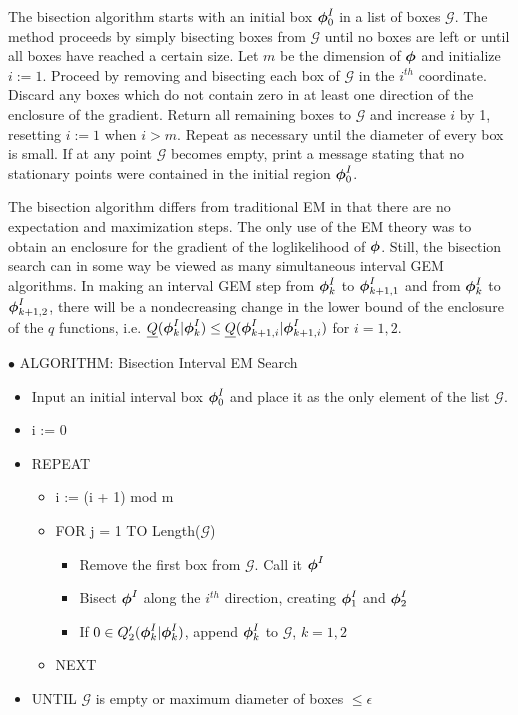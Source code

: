 The bisection algorithm starts with an initial box $\mbox{\boldmath $\phi$}_0^I$ in a
list of boxes $\mathcal{G}$.  The method proceeds by 
simply bisecting boxes from $\mathcal{G}$
until no boxes are left or until all boxes have reached a certain
size.  Let $m$ be the dimension of $\mbox{\boldmath $\phi$}$ and initialize $i := 1$.
Proceed by removing and bisecting each box of $\mathcal{G}$ in the $i^{th}$
coordinate.  Discard any boxes which do not contain zero in at least
one direction of the enclosure of the gradient.  Return all
remaining boxes to $\mathcal{G}$ and increase $i$ by 1, resetting $i := 1$ when
$i > m$.
Repeat as necessary until the diameter of every box is small.  If at
any point $\mathcal{G}$ becomes empty, print a message stating that
no stationary points were contained in the initial region $\mbox{\boldmath $\phi$}^I_0$.

The bisection algorithm differs from traditional EM in that there
are no expectation and maximization steps.  The only use of the EM
theory was to obtain an enclosure for the gradient of the
loglikelihood of $\mbox{\boldmath $\phi$}$.  Still, the bisection search can in some way be
viewed as many simultaneous interval GEM algorithms.  In making an interval GEM
step from
$\mbox{\boldmath $\phi$}_k^I$ to $\mbox{\boldmath $\phi$}_{k+1,1}^I$ and from $\mbox{\boldmath $\phi$}_k^I$ 
to $\mbox{\boldmath $\phi$}_{k+1,2}^I$, there will be a 
nondecreasing change in the
lower bound of the enclosure of the $q$ functions, i.e.
$\underline{Q}(\mbox{\boldmath $\phi$}_k^I|\mbox{\boldmath $\phi$}_k^I) 
\leq \underline{Q}(\mbox{\boldmath $\phi$}^I_{k+1,i}|\mbox{\boldmath $\phi$}^I_{k+1,i})$ 
for $i =1,2$. 


$\bullet$ ALGORITHM: Bisection Interval EM Search
\begin{itemize}
\item[] Input an initial interval box $\mbox{\boldmath $\phi$}^I_0$ and place it as the only element of the list $\mathcal{G}$.
\item[] i := 0
\item[] REPEAT
  \begin{itemize}
  \item[]  i := (i + 1) mod m
  \item[]  FOR j = 1 TO Length($\mathcal{G}$)
    \begin{itemize}
    \item[] Remove the first box from $\mathcal{G}$.  Call it $\mbox{\boldmath $\phi$}^I$
    \item[] Bisect $\mbox{\boldmath $\phi$}^I$ along the $i^{th}$ direction, creating $\mbox{\boldmath $\phi$}^I_1$ and $\mbox{\boldmath $\phi$}^I_2$
    \item[] If $0 \in Q'_2(\mbox{\boldmath $\phi$}^I_k|\mbox{\boldmath $\phi$}^I_k)$, append $\mbox{\boldmath $\phi$}^I_k$ to $\mathcal{G}$, $k=1,2$
    \end{itemize}
  \item[] NEXT
  \end{itemize}
\item[] UNTIL  $\mathcal{G}$ is empty or maximum diameter of boxes $\leq \epsilon$
\end{itemize}

